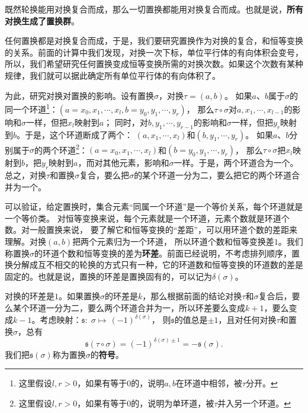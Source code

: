 \documentclass[12pt,UTF8]{ctexbook}
\begin{document}
既然轮换能用对换复合而成，那么一切置换都能用对换复合而成。也就是说，\textbf{所有对换生成了置换群}。

任何置换都是对换复合而成，于是，我们要研究置换作为对换的复合，和恒等变换的关系。前面的计算中我们发现，对换一次下标，单位平行体的有向体积会变号，所以，我们希望研究任何置换变成恒等变换所需的对换次数。如果这个次数有某种规律，我们就可以据此确定所有单位平行体的有向体积了。

为此，研究对换对置换的影响。设有置换$\sigma$，对换$\tau = (a, b)$。
如果$a$、$b$属于$\sigma$的同一个环道\footnote{这里假设$l,r>0$，如果有等于$0$的，说明$a,b$在环道中相邻，被$\tau$分开。}：$(a=x_0, x_1, \cdots, x_l, b=y_0, y_1, \cdots, y_r)$，
那么$\tau\circ\sigma$对$a,x_1, \cdots, x_{l-1}$的影响和$\sigma$一样，但把$x_l$映射到$a$；
同时，对$b,  y_1, \cdots, y_{r-1}$的影响和$\sigma$一样，但把$y_r$映射到$b$。于是，这个环道断成了两个：
$(a, x_1, \cdots, x_l)$和$(b, y_1, \cdots, y_r)$。
如果$a$、$b$分别属于$\sigma$的两个环道\footnote{这里假设$l,r>0$，如果有等于$0$的，说明为单环道，被$\tau$并入另一个环道。}：$(a=x_0, x_1, \cdots, x_l)$和$(b=y_0, y_1, \cdots, y_r)$，
那么$\tau\circ\sigma$把$x_l$映射到$b$，把$y_r$映射到$a$，而对其他元素，影响和$\sigma$一样。于是，两个环道合为一个。
总之，对换$\tau$和置换$\sigma$复合，要么把$\sigma$的某个环道一分为二，要么把它的两个环道合并为一个。

可以验证，给定置换时，集合元素“同属一个环道”是一个等价关系，每个环道就是一个等价类。
对恒等变换来说，每个元素就是一个环道，元素个数就是环道个数。对一般置换来说，
要了解它和恒等变换的“差距”，可以用环道个数的差距来理解。对换$(a, b)$把两个元素归为一个环道，
所以环道个数和恒等变换差$1$。我们称置换$\sigma$的环道个数和恒等变换的差为\textbf{环差}。前面已经说明，不考虑排列顺序，置换分解成互不相交的轮换的方式只有一种，它的环道数和恒等变换的环道数的差是固定的。也就是说，置换的环差是置换固有的，可以记为$\delta(\sigma)$。

对换的环差是$1$。如果置换$\sigma$的环差是$k$，那么根据前面的结论对换$\tau$和$\sigma$复合后，要么某个环道一分为二，要么两个环道合并为一，所以环差要么变成$k+1$，要么变成$k-1$。考虑映射：$\mathfrak{s}:\;\sigma \mapsto\, (-1)^{\delta(\sigma)}$，
则$\mathfrak{s}$的值总是$\pm 1$，且对任何对换$\tau$和置换$\sigma$，总有
$$\mathfrak{s}(\tau\circ\sigma) = (-1)^{\delta(\sigma)\pm 1} = -\mathfrak{s}(\sigma).$$
我们把$\mathfrak{s}(\sigma)$称为置换$\sigma$的\textbf{符号}。
\end{document}
